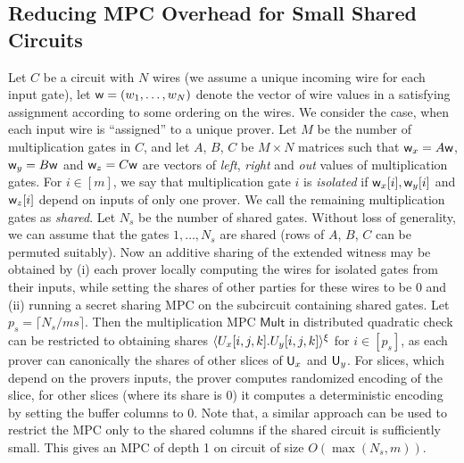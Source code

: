\subsection{Reducing MPC Overhead for Small Shared Circuits}\label{sec:sharedcircuitopti}
Let $C$ be a circuit with $N$ wires (we assume a unique incoming wire for each
input gate), let $\mathsf{w}=(w_1,\ldots,w_N)$ denote the vector of wire values in a
satisfying assignment according to some ordering on the wires. We consider the
case, when each input wire is ``assigned'' to a unique prover. Let $M$ be the
number of multiplication gates in $C$, and let $A$, $B$, $C$ 
 be $M\times N$ matrices such that $\mathsf{w}_x=A\mathsf{w}$, $\mathsf{w}_y=B\mathsf{w}$
and $\mathsf{w}_z=C\mathsf{w}$ are vectors of {\em left}, {\em right} and {\em out} values
of multiplication gates. For $i\in [m]$, we say that multiplication gate $i$ is
{\em isolated} if $\mathsf{w}_x[i],\mathsf{w}_y[i]$ and $\mathsf{w}_z[i]$ depend on inputs of only
one prover. We call the remaining multiplication gates as {\em shared}. Let
$N_s$ be the number of shared gates. Without loss of generality, we can assume
that the gates $1,\ldots,N_s$ are shared (rows of  $A$, $B$, $C$ can be permuted
suitably). Now an additive sharing of the extended witness may be obtained by
(i) each prover locally computing the wires for isolated gates from their
inputs, while setting the shares of other parties for these wires to be $0$ and
(ii) running a secret sharing MPC on the subcircuit containing shared gates.
Let $p_s=\lceil N_s/ms \rceil$. Then the multiplication MPC $\mathsf{Mult}$ in
distributed quadratic check can be restricted to obtaining shares
$\langle{U_x[i,j,k].U_y[i,j,k]}\rangle^\xi$ for $i\in [p_s]$, as each prover can canonically 
the shares of other slices of $\mathsf{U}_x$ and $\mathsf{U}_y$. For slices, which depend
on the provers inputs, the prover computes randomized encoding of the slice, for
other slices (where its share is $0$) it computes a deterministic encoding by
setting the buffer columns to $0$. Note that, a similar approach can be used to restrict the MPC only to the shared columns if the shared circuit is sufficiently small. This gives an MPC of depth 1 on circuit of
size $O(\max(N_s, m))$. 
